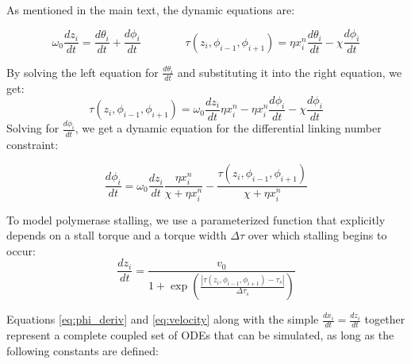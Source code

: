 \documentclass[11pt]{article}
\begin{document}
As mentioned in the main text, the dynamic equations are:

\begin{equation}
    \omega_0 \frac{d z_i}{dt} = \frac{d \theta_i}{dt} + \frac{d \phi_i}{dt} \qquad \qquad \tau(z_i, \phi_{i-1}, \phi_{i+1}) = \eta x_i^n \frac{d\theta_i}{dt} - \chi \frac{d\phi_i}{dt}
\end{equation}

By solving the left equation for \(\frac{d \theta_i}{dt}\) and substituting it into the right equation, we get:
\[\tau(z_i, \phi_{i-1}, \phi_{i+1}) = \omega_0 \frac{dz_i}{dt} \eta x_i^n - \eta x_i^n \frac{d\phi_i}{dt} - \chi \frac{d\phi_i}{dt}\]
Solving for \(\frac{d\phi_i}{dt}\), we get a dynamic equation for the differential linking number constraint:

\begin{equation}
    \frac{d\phi_i}{dt} = \omega_0 \frac{dz_i}{dt} \frac{\eta x_i^n}{\chi + \eta x_i^n} - \frac{\tau(z_i, \phi_{i-1}, \phi_{i+1})}{\chi + \eta x_i^n}
\end{equation} \label{eq:phi_deriv}

To model polymerase stalling, we use a parameterized function that explicitly depends on a stall torque and a torque width \(\Delta \tau\) over which stalling begins to occur:
\begin{equation}
    \frac{dz_i}{dt} = \frac{v_0}{1 + \exp\left(\frac{|\tau(z_i, \phi_{i-1}, \phi_{i+1}) - \tau_s|}{\Delta \tau_s}\right)}
\end{equation} \label{eq:velocity}

Equations \ref{eq:phi_deriv} and \ref{eq:velocity} along with the simple \(\frac{dx_i}{dt} = \frac{dz_i}{dt}\) together represent a complete coupled set of ODEs that can be simulated, as long as the following constants are defined:
\end{document}

